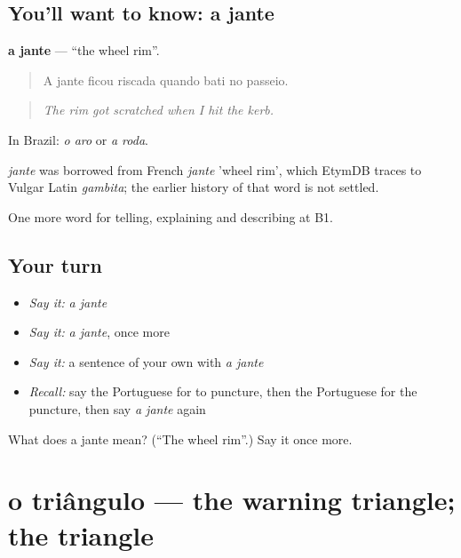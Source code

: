 \subsection*{You'll want to know: a jante}
\textbf{a jante} — \textquotedblleft{}the wheel rim\textquotedblright{}.

\begin{quote}
A jante ficou riscada quando bati no passeio.
\end{quote}

\begin{quote}
\emph{The rim got scratched when I hit the kerb.}
\end{quote}

In Brazil: \emph{o aro} or \emph{a roda}.

\begin{cousinweb}
\emph{jante} was borrowed from French \emph{jante} 'wheel rim', which EtymDB traces to Vulgar Latin \emph{gambita}; the earlier history of that word is not settled.
\end{cousinweb}

\begin{grammarlens}[title={What you've built}]
One more word for telling, explaining and describing at B1.
\end{grammarlens}

\subsection*{Your turn}
\begin{itemize}
\raggedright
  \item \emph{Say it:} \emph{a jante}
  \item \emph{Say it:} \emph{a jante}, once more
  \item \emph{Say it:} a sentence of your own with \emph{a jante}
  \item \emph{Recall:} say the Portuguese for to puncture, then the Portuguese for the puncture, then say \emph{a jante} again
\end{itemize}

\begin{tcolorbox}[breakable,colback=teal!4,colframe=teal!35!black,title={Before you move on}]
What does a jante mean? (\textquotedblleft{}The wheel rim\textquotedblright{}.) Say it once more.
\end{tcolorbox}
\section[o triângulo]{o triângulo — the warning triangle; the triangle}

